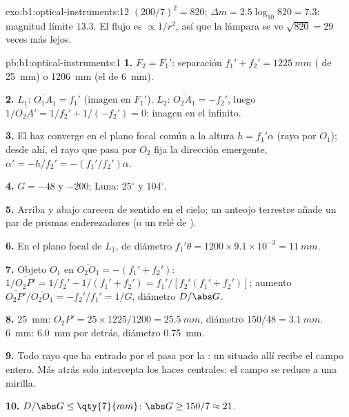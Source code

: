 \begin{solution}{exo:b1:optical-instruments:12}
$(200/7)^2 = 820$; $\Delta m = 2.5\log_{10}820 = 7.3$: magnitud límite
$13.3$. El flujo es $\propto 1/r^2$, así que la lámpara se ve
$\sqrt{820} = 29$ veces más lejos.
\end{solution}

\begin{solution}{pb:b1:optical-instruments:1}
\textbf{1.} $F_2 = F_1'$: separación $f_1' + f_2' = \qty{1225}{mm}$
( de \qty{25}{mm}) o \qty{1206}{mm} (el de \qty{6}{mm}).

\textbf{2.} $L_1$: $\overline{O_1A_1} = f_1'$ (imagen en $F_1'$). $L_2$:
$\overline{O_2A_1} = -f_2'$, luego $1/\overline{O_2A'} = 1/f_2' + 1/(-f_2')
= 0$: imagen en el infinito.

\textbf{3.} El haz converge en el plano focal común a la altura $h =
f_1'\alpha$ (rayo por $O_1$); desde ahí, el rayo que pasa por $O_2$ fija
la dirección emergente, $\alpha' = -h/f_2' = -(f_1'/f_2')\alpha$.

\textbf{4.} $G = -48$ y $-200$; Luna: $25^\circ$ y $104^\circ$.

\textbf{5.} Arriba y abajo carecen de sentido en el cielo; un anteojo
terrestre añade un par de prismas enderezadores (o un relé de ).

\textbf{6.} En el plano focal de $L_1$, de diámetro $f_1'\theta = 1200 \times
9.1\times10^{-3} = \qty{11}{mm}$.

\textbf{7.} Objeto $O_1$ en $\overline{O_2O_1} = -(f_1' + f_2')$:
$1/\overline{O_2P'} = 1/f_2' - 1/(f_1' + f_2') = f_1'/[f_2'(f_1' + f_2')]$;
aumento $\overline{O_2P'}/\overline{O_2O_1} = -f_2'/f_1' = 1/G$,
diámetro $D/\abs G$.

\textbf{8.} \qty{25}{mm}: $\overline{O_2P'} = 25 \times 1225/1200 =
\qty{25.5}{mm}$, diámetro $150/48 = \qty{3.1}{mm}$. \qty{6}{mm}:
\qty{6.0}{mm} por detrás, diámetro \qty{0.75}{mm}.

\textbf{9.} Todo rayo que ha entrado por el  pasa por la : un  situado allí recibe el campo entero. Más atrás solo
intercepta los haces centrales: el campo se reduce a una mirilla.

\textbf{10.} $D/\abs G \leq \qty{7}{mm}$: $\abs G \geq 150/7 \approx 21$.


\end{solution}
